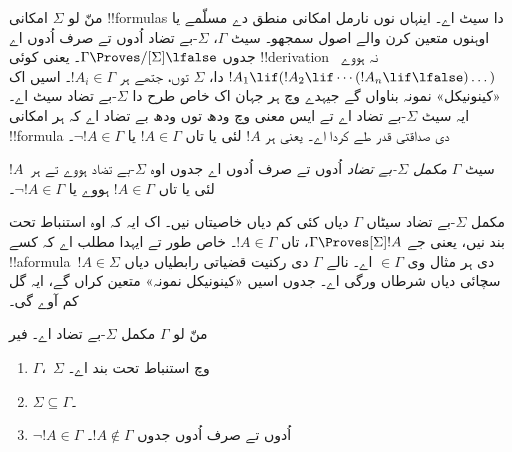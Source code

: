 \documentclass[../../../include/open-logic-section]{subfiles}
\begin{document}


منّ لو $\Sigma$ امکانی !!{formula}s دا سیٹ اے۔ اینہاں نوں نارمل امکانی منطق دے مسلّمے یا اوہنوں متعین کرن والے اصول سمجھو۔ سیٹ $\Gamma$، $\Sigma$-بے تضاد اُدوں تے صرف اُدوں اے جدوں $\Gamma \Proves/[\Sigma] \lfalse$۔ یعنی کوئی !!{derivation} نہ ہووے~$!A_1 \lif (!A_2 \lif \cdots (!A_n \lif
\lfalse)\dots)$ دا، $\Sigma$ توں، جتھے ہر $!A_i \in \Gamma$۔ اسیں اک «کینونیکل» نمونہ بناواں گے جیہدے وچ ہر جہان اک خاص طرح دا $\Sigma$-بے تضاد سیٹ اے۔ ایہ سیٹ $\Sigma$-بے تضاد اے تے ایس معنی وچ ودھ توں ودھ بے تضاد اے کہ ہر امکانی !!{formula} دی صداقتی قدر طے کردا اے۔ یعنی ہر $!A$ لئی یا تاں $!A
\in \Gamma$ یا $\lnot !A \in \Gamma$۔

\begin{defn}
  سیٹ $\Gamma$ \emph{مکمل $\Sigma$-بے تضاد} اُدوں تے صرف اُدوں اے جدوں اوہ $\Sigma$-بے تضاد ہووے تے ہر~$!A$ لئی یا تاں
  $!A \in \Gamma$ ہووے یا $\lnot !A \in \Gamma$۔
\end{defn}

مکمل $\Sigma$-بے تضاد سیٹاں $\Gamma$ دیاں کئی کم دیاں خاصیتاں نیں۔ اک ایہ کہ اوہ استنباط تحت بند نیں، یعنی جے $\Gamma
\Proves[\Sigma] !A$، تاں $!A \in \Gamma$۔ خاص طور تے ایہدا مطلب اے کہ کسے !!a{formula}~$!A \in \Sigma$ دی ہر مثال وی $\in
\Gamma$ اے۔ نالے $\Gamma$ دی رکنیت قضیاتی رابطیاں دیاں سچائی دیاں شرطاں ورگی اے۔ جدوں اسیں «کینونیکل نمونہ» متعین کراں گے، ایہ گل کم آوے گی۔

\begin{prop}
  منّ لو $\Gamma$ مکمل $\Sigma$-بے تضاد اے۔ فیر
  \begin{enumerate}
  \item {}%
    $\Gamma$،~$\Sigma$ وچ استنباط تحت بند اے۔
  \item {}%
    $\Sigma \subseteq \Gamma$۔
  \item {}%
    $\lnot!A \in \Gamma$ اُدوں تے صرف اُدوں جدوں $!A \notin
    \Gamma$۔
  \end{enumerate}
\end{prop}
\end{document}
